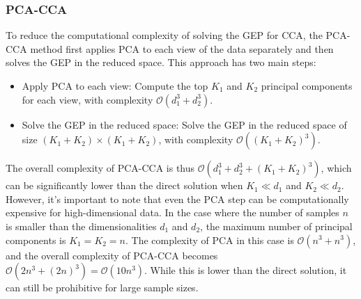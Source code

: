 \subsubsection{PCA-CCA}
To reduce the computational complexity of solving the GEP for CCA, the PCA-CCA method first applies PCA to each view of the data separately and then solves the GEP in the reduced space\cite{mihalik2022canonical}. This approach has two main steps:

\begin{itemize}
    \item Apply PCA to each view: Compute the top $K_1$ and $K_2$ principal components for each view, with complexity $\mathcal{O}(d_1^3 + d_2^3)$.
    \item Solve the GEP in the reduced space: Solve the GEP in the reduced space of size $(K_1 + K_2) \times (K_1 + K_2)$, with complexity $\mathcal{O}((K_1 + K_2)^3)$.
\end{itemize}

The overall complexity of PCA-CCA is thus $\mathcal{O}(d_1^3 + d_2^3 + (K_1 + K_2)^3)$, which can be significantly lower than the direct solution when $K_1 \ll d_1$ and $K_2 \ll d_2$.
However, it's important to note that even the PCA step can be computationally expensive for high-dimensional data. In the case where the number of samples $n$ is smaller than the dimensionalities $d_1$ and $d_2$, the maximum number of principal components is $K_1 = K_2 = n$. The complexity of PCA in this case is $\mathcal{O}(n^3 + n^3)$, and the overall complexity of PCA-CCA becomes $\mathcal{O}(2n^3 + (2n)^3) = \mathcal{O}(10n^3)$. While this is lower than the direct solution, it can still be prohibitive for large sample sizes.
